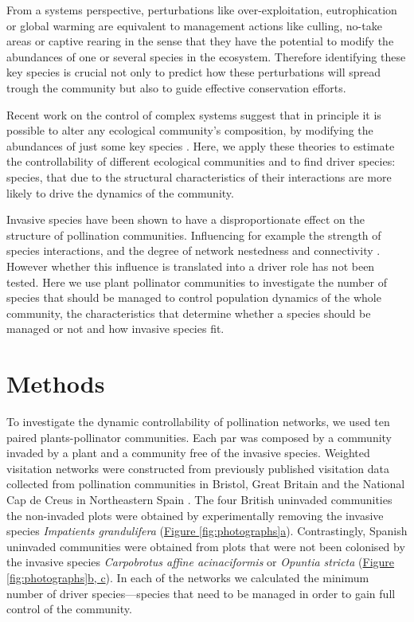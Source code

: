 \documentclass[a4paper,10pt]{article}
\begin{document}
From a systems perspective, perturbations like over-exploitation, eutrophication or global warming are equivalent to management actions like culling, no-take areas or captive rearing in the sense that they have the potential to modify the abundances of one or several species in the ecosystem. Therefore identifying these key species is crucial not only to predict how these perturbations will spread trough the community but also to guide effective conservation efforts.

Recent work on the control of complex systems suggest that in principle it is possible to alter any ecological community's composition, by modifying the abundances of just some key species \autocite{Isbell2013, Cornelius2013}. Here, we apply these theories to estimate the controllability of different ecological communities and to find driver species: species, that due to the structural characteristics of their interactions are more likely to drive the dynamics of the community.

Invasive species have been shown to have a disproportionate effect on the structure of pollination communities. Influencing for example the strength of species interactions, and the degree of network nestedness and connectivity \autocite{Olesen2002, Aizen2008, Bartomeus2008, Vila2009, Traveset2013}. However whether this influence is translated into a driver role has not been tested. Here we use plant pollinator communities to investigate the number of species that should be managed to control population dynamics of the whole community, the characteristics that determine whether a species should be managed or not and how invasive species fit. 

\section*{Methods} 

To investigate the dynamic controllability of pollination networks, we used ten paired plants-pollinator communities. Each par was composed by a community invaded by a plant and a community free of the invasive species. Weighted visitation networks were constructed from previously published visitation data collected from pollination communities in Bristol, Great Britain \autocite{Lopezaraiza-Mikel2007} and the National Cap de Creus in Northeastern Spain \autocite{Bartomeus2008}. The four British uninvaded communities the non-invaded plots were obtained by experimentally removing the invasive species \textit{Impatients grandulifera} (\hyperref[fig:photographs]{Figure \ref{fig:photographs}a}). Contrastingly, Spanish uninvaded communities were obtained from plots that were not been colonised by the invasive species \textit{Carpobrotus affine acinaciformis} or \textit{Opuntia stricta} (\hyperref[fig:photographs]{Figure \ref{fig:photographs}b, c}). In each of the networks we calculated the minimum number of driver species---species that need to be managed in order to gain full control of the community.
\end{document}
